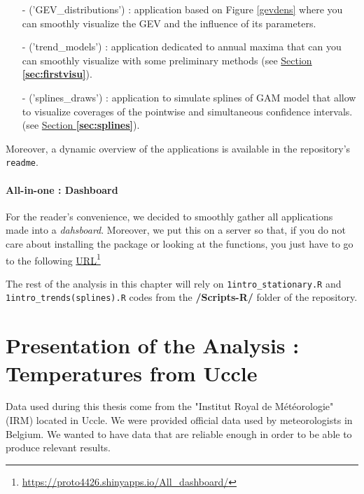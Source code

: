 \begin{itemize}
	\item[-]('GEV\_distributions') :  application based on Figure \ref{gevdens} where you can smoothly visualize the GEV and the influence of its parameters.
	
	\item[-] ('trend\_models') :
	application dedicated to annual maxima that can you can smoothly visualize with some preliminary methods (see \hyperref[sec:firstvisu]{Section \textbf{\ref{sec:firstvisu}}}).
	
	\item[-] ('splines\_draws') : application to simulate splines of GAM model that allow to visualize coverages of the pointwise and simultaneous confidence intervals. (see \hyperref[sec:splines]{Section \textbf{\ref{sec:splines}}}).

\end{itemize}
Moreover, a dynamic overview of the applications is available in the repository's \texttt{readme}.

\paragraph*{All-in-one : Dashboard} For the reader's convenience, we decided to smoothly gather all applications made into a \emph{dahsboard}. Moreover, we put this on a server so that, if you do not care about installing the package or looking at the functions, you just have to go to the following \href{https://proto4426.shinyapps.io/All\_dashboard/}{URL}\footnote{\url{https://proto4426.shinyapps.io/All\_dashboard/}}
\newline

The rest of the analysis in this chapter will rely on \texttt{1intro\_stationary.R} and \\ \texttt{1intro\_trends(splines).R} codes from the \textbf{/Scripts-R/} folder of the  repository.


\section{Presentation of the Analysis : Temperatures from Uccle}\label{sec:presuccle}

Data used during this thesis come from the "Institut Royal de Météorologie" (IRM) located in Uccle. We were provided official data used by meteorologists in Belgium. We wanted to have data that are reliable enough in order to be able to produce relevant results. 

